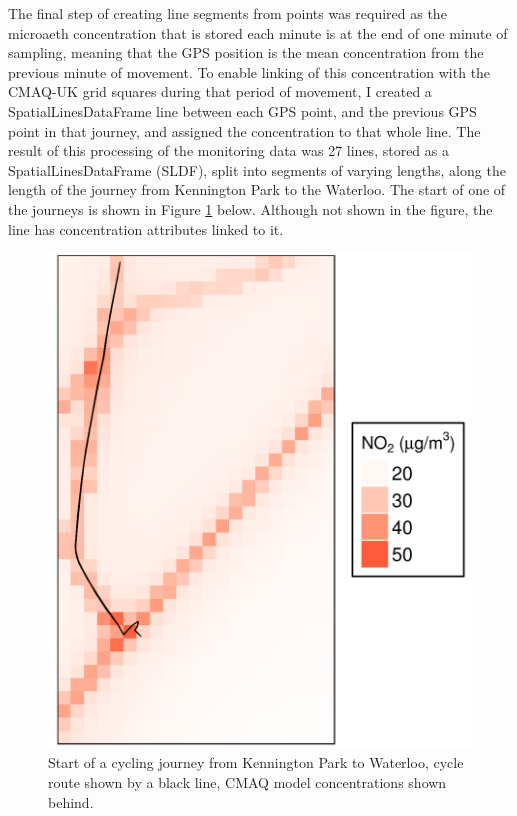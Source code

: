 The final  step of creating line segments from points was required as the microaeth concentration that is stored each minute is at the end of one minute of sampling, meaning that the GPS position is the mean concentration from the previous minute of movement. To enable linking of this concentration with the CMAQ-UK grid squares during that period of movement, I created a SpatialLinesDataFrame line between each GPS point, and the previous GPS point in that journey, and assigned the concentration to that whole line.
The result of this processing of the monitoring data was 27 lines, stored as a SpatialLinesDataFrame (SLDF), split into segments of varying lengths, along the length of the journey from Kennington Park to the Waterloo. The start of one of the journeys is shown in Figure \ref{fig:cmaq_cycle_route_zoomed} below. Although not shown in the figure, the line has concentration attributes linked to it.

\begin{figure}[H]
\centering
\includegraphics[scale=0.2]{images/cmaq_cycle_route_zoomed.png}
\caption{Start of a cycling journey from Kennington Park to Waterloo, cycle route shown by a black line, CMAQ model concentrations shown behind.}
\label{fig:cmaq_cycle_route_zoomed}
\end{figure}

